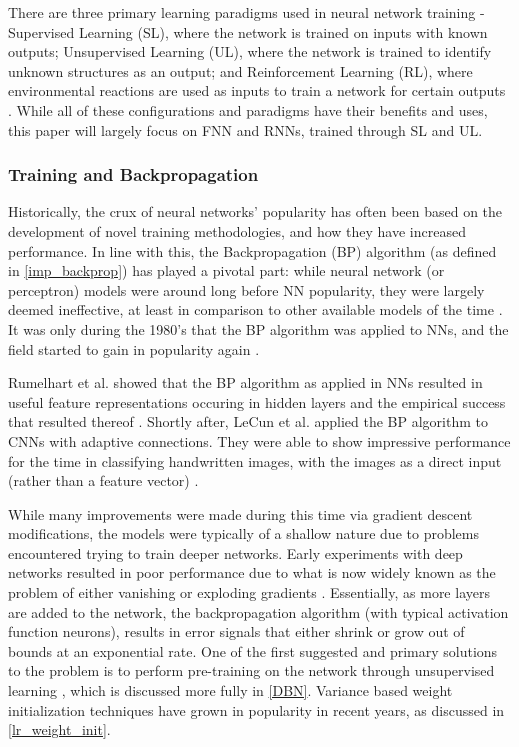 \documentclass[a4paper,11pt,oneside]{article}
\theoremstyle{plain}
\theoremstyle{definition}
\begin{document}
There are three primary learning paradigms used in neural network training - Supervised Learning (SL), 
where the network is trained on inputs with known outputs; Unsupervised Learning (UL), where the network is 
trained to identify unknown structures as an output; and Reinforcement Learning (RL), where environmental
reactions are used as inputs to train a network for certain outputs \cite{Schmidhuber}. While all of these configurations and paradigms 
have their benefits and uses, this paper will largely focus on FNN and RNNs, trained through SL and UL.
\hfill \break 

\subsubsection{Training and Backpropagation}\label{lr_trainingbackprop}

Historically, the crux of neural networks’ popularity has often been based on the development of novel training 
methodologies, and how they have increased performance. In line with this, the Backpropagation (BP) algorithm (as defined in \ref{imp_backprop})
has played a pivotal part: while neural network (or perceptron) models were around long before NN popularity, 
they were largely deemed ineffective, at least in comparison to other available models of the time 
\cite{Minksy}. It was only during the 1980’s that the BP algorithm was applied to NNs, and 
the field started to gain in popularity again \cite{LeCun2, Werbos2}. 
\hfill \break 

Rumelhart et al. showed that the BP algorithm as applied in NNs resulted in useful feature representations 
occuring in hidden layers and the empirical success that resulted thereof \cite{Rumelhart}.  
Shortly after, LeCun et al. applied the BP algorithm to CNNs with adaptive connections. They were able to show 
impressive performance for the time in classifying handwritten images, with the images as a direct input (rather than a feature vector) \cite{LeCun3}.
\hfill \break 

While many improvements were made during this time via gradient descent modifications, the 
models were typically of a shallow nature due to problems encountered trying to train deeper networks. 
Early experiments with deep networks resulted in poor performance due to what is now widely known as the problem 
of either vanishing or exploding gradients \cite{Pascanu}. Essentially, as more layers are added to the network, the backpropagation 
algorithm (with typical activation function neurons), results in error signals that either shrink or grow out of bounds at an 
exponential rate. One of the first suggested and primary solutions to the problem is to perform pre-training on the 
network through unsupervised learning  \cite{Schmidhuber}, which is discussed more fully in \ref{DBN}. Variance based 
weight initialization techniques have grown in popularity in recent years, as discussed in \ref{lr_weight_init}.
\hfill \break 
\end{document}
